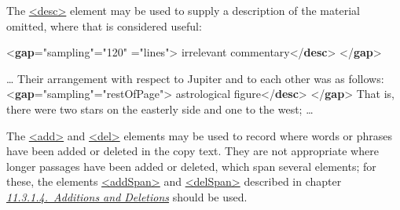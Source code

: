The \hyperref[TEI.desc]{<desc>} element may be used to supply a description of the material omitted, where that is considered useful: \par\bgroup{}\exampleFont \begin{shaded}\noindent\mbox{}{<\textbf{gap}\hspace*{1em}{reason}="{sampling}"\hspace*{1em}{quantity}="{120}"\mbox{}\newline 
\hspace*{1em}{unit}="{lines}">}\mbox{}\newline 
{}irrelevant commentary{</\textbf{desc}>}\mbox{}\newline 
{</\textbf{gap}>}\end{shaded}\egroup\par \noindent  \par\bgroup{}\exampleFont \begin{shaded}\noindent\mbox{}… Their arrangement with respect to Jupiter and to each other was as follows:\mbox{}\newline 
{<\textbf{gap}\hspace*{1em}{reason}="{sampling}"\hspace*{1em}{extent}="{restOfPage}">}\mbox{}\newline 
{}astrological figure{</\textbf{desc}>}\mbox{}\newline 
{</\textbf{gap}>}\mbox{}\newline 
 That is, there were two stars on the easterly side and one to the\mbox{}\newline 
 west; …\end{shaded}\egroup\par \noindent     \par
The \hyperref[TEI.add]{<add>} and \hyperref[TEI.del]{<del>} elements may be used to record where words or phrases have been added or deleted in the copy text. They are not appropriate where longer passages have been added or deleted, which span several elements; for these, the elements \hyperref[TEI.addSpan]{<addSpan>} and \hyperref[TEI.delSpan]{<delSpan>} described in chapter \textit{\hyperref[PHAD]{11.3.1.4.\ Additions and Deletions}} should be used.\par
